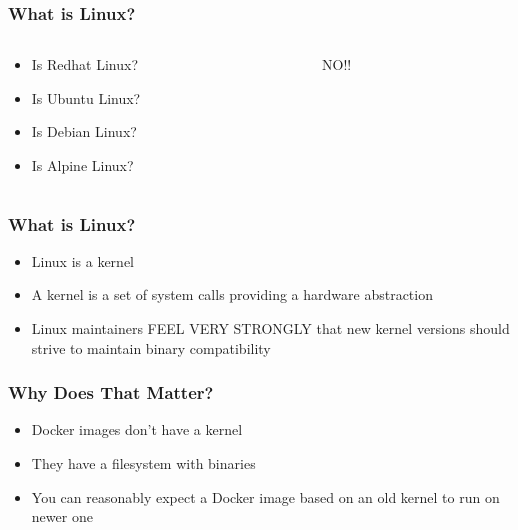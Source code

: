     \begin{frame}
    \frametitle{What is Linux?}
    \begin{columns}
        \begin{column}{0.5\textwidth}
            \begin{itemize}
                \item Is Redhat Linux?\pause
                \item Is Ubuntu Linux?\pause
                \item Is Debian Linux?\pause
                \item Is Alpine Linux?\pause
            \end{itemize}
        \end{column}
        \begin{column}{0.5\textwidth}
          \begin{center}
            {\Huge \color{red} NO!!}
          \end{center}
        \end{column}
    \end{columns}
    \end{frame}

    \begin{frame}
    \frametitle{What is Linux?}
    \begin{itemize}
        \item Linux is a kernel\pause
        \item A kernel is a set of system calls providing a hardware abstraction\pause
        \item Linux maintainers FEEL VERY STRONGLY that new kernel versions should strive to maintain binary compatibility
    \end{itemize}
    \end{frame}

    \begin{frame}
      \frametitle{Why Does That Matter?}
      \begin{itemize}
      \item Docker images don't have a kernel\pause
      \item They have a filesystem with binaries\pause
      \item You can reasonably expect a Docker image based on an old kernel to run on newer one
      \end{itemize}
    \end{frame}

